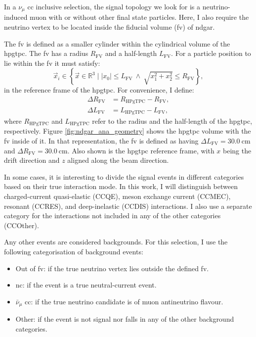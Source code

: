 In a $\nu_{\mu}$ \gls{cc} inclusive selection, the signal topology we look for is a neutrino-induced muon with or without other final state particles. Here, I also require the neutrino vertex to be located inside the fiducial volume (\gls{fv}) of \gls{ndgar}.

The \gls{fv} is defined as a smaller cylinder within the cylindrical volume of the \gls{hpgtpc}. The \gls{fv} has a radius $R_{\mathrm{FV}}$ and a half-length $L_{\mathrm{FV}}$. For a particle position to lie within the \gls{fv} it must satisfy:
\begin{equation}
    \vec{x}_{i} \in \left\{\vec{x} \in \mathbb{R}^{3} \mid |x_{0}| \leq L_{\mathrm{FV}} ~ \land ~ \sqrt{x_{1}^{2}+x_{2}^{2}} \leq R_{\mathrm{FV}}\right\},
\end{equation}
in the reference frame of the \gls{hpgtpc}. For convenience, I define:
\begin{equation}
    \begin{split}
        \Delta R_{\mathrm{FV}} &= R_{\mathrm{HPgTPC}} - R_{\mathrm{FV}}, \\
        \Delta L_{\mathrm{FV}} &= L_{\mathrm{HPgTPC}} - L_{\mathrm{FV}},
    \end{split}
\end{equation}
where $R_{\mathrm{HPgTPC}}$ and $L_{\mathrm{HPgTPC}}$ refer to the radius and the half-length of the \gls{hpgtpc}, respectively. Figure \ref{fig:ndgar_ana_geometry} shows the \gls{hpgtpc} volume with the \gls{fv} inside of it. In that representation, the \gls{fv} is defined as having $\Delta L_{\mathrm{FV}} = 30.0 ~ \mathrm{cm}$ and $\Delta R_{\mathrm{FV}} = 30.0 ~ \mathrm{cm}$. Also shown is the \gls{hpgtpc} reference frame, with $x$ being the drift direction and $z$ aligned along the beam direction.

In some cases, it is interesting to divide the signal events in different categories based on their true interaction mode. In this work, I will distinguish between charged-current quasi-elastic (CCQE), meson exchange current (CCMEC), resonant (CCRES), and deep-inelastic (CCDIS) interactions. I also use a separate category for the interactions not included in any of the other categories (CCOther).

Any other events are considered backgrounds. For this selection, I use the following categorisation of background events:
\begin{itemize}
    \item Out of \gls{fv}: if the true neutrino vertex lies outside the defined \gls{fv}.
    \item \gls{nc}: if the event is a true neutral-current event.
    \item $\bar{\nu}_{\mu}$ \gls{cc}: if the true neutrino candidate is of muon antineutrino flavour.
    \item Other: if the event is not signal nor falls in any of the other background categories.
\end{itemize}

